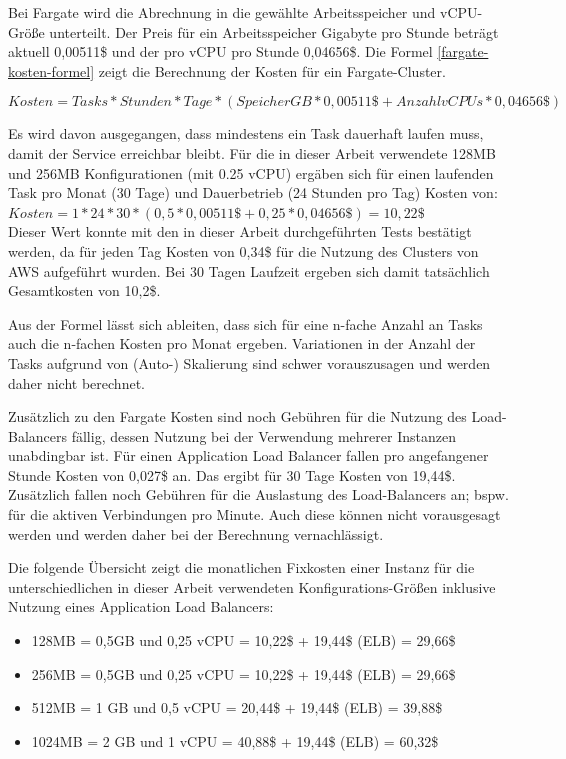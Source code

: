 Bei Fargate wird die Abrechnung in die gewählte Arbeitsspeicher und vCPU-Größe unterteilt. Der Preis für ein Arbeitsspeicher Gigabyte pro Stunde beträgt aktuell 0,00511\$ und der pro vCPU pro Stunde 0,04656\$. Die Formel \ref{fargate-kosten-formel} zeigt die Berechnung der Kosten für ein Fargate-Cluster.


\begin{equation}
Kosten = Tasks * Stunden * Tage * (SpeicherGB * 0,00511\$ + AnzahlvCPUs * 0,04656\$)
\label{fargate-kosten-formel}
\end{equation}

Es wird davon ausgegangen, dass mindestens ein Task dauerhaft laufen muss, damit der Service erreichbar bleibt. Für die in dieser Arbeit verwendete 128MB und 256MB Konfigurationen (mit 0.25 vCPU) ergäben sich für einen laufenden Task pro Monat (30 Tage) und Dauerbetrieb (24 Stunden pro Tag) Kosten von: \\

$Kosten = 1 * 24 * 30 * (0,5 * 0,00511\$ + 0,25 * 0,04656\$) = 10,22\$$ \\

Dieser Wert konnte mit den in dieser Arbeit durchgeführten Tests bestätigt werden, da für jeden Tag Kosten von 0,34\$ für die Nutzung des Clusters von AWS aufgeführt wurden. Bei 30 Tagen Laufzeit ergeben sich damit tatsächlich Gesamtkosten von 10,2\$.

Aus der Formel lässt sich ableiten, dass sich für eine n-fache Anzahl an Tasks auch die n-fachen Kosten pro Monat ergeben. Variationen in der Anzahl der Tasks aufgrund von (Auto-) Skalierung sind schwer vorauszusagen und werden daher nicht berechnet.

Zusätzlich zu den Fargate Kosten sind noch Gebühren für die Nutzung des Load-Balancers fällig, dessen Nutzung bei der Verwendung mehrerer Instanzen unabdingbar ist. Für einen Application Load Balancer fallen pro angefangener Stunde Kosten von 0,027\$ an. Das ergibt für 30 Tage Kosten von 19,44\$. Zusätzlich fallen noch Gebühren für die Auslastung des Load-Balancers an; bspw. für die aktiven Verbindungen pro Minute\cite{noauthor_preise_nodate}. Auch diese können nicht vorausgesagt werden und werden daher bei der Berechnung vernachlässigt.

Die folgende Übersicht zeigt die monatlichen Fixkosten einer Instanz für die unterschiedlichen in dieser Arbeit verwendeten Konfigurations-Größen inklusive Nutzung eines Application Load Balancers:

\begin{itemize}
    \item 128MB = 0,5GB und 0,25 vCPU = 10,22\$ + 19,44\$ (ELB) = 29,66\$
    \item 256MB = 0,5GB und 0,25 vCPU = 10,22\$ + 19,44\$ (ELB) = 29,66\$
    \item 512MB = 1  GB und 0,5  vCPU = 20,44\$ + 19,44\$ (ELB) = 39,88\$
    \item 1024MB = 2 GB und 1    vCPU = 40,88\$ + 19,44\$ (ELB) = 60,32\$
\end{itemize}

